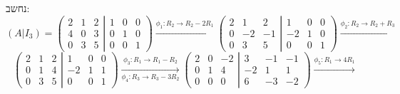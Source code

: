 \documentclass{article}
\begin{document}
נחשב:
\[
    (A | I_3) =
    \left(
    \begin{matrix}
            2 & 1 & 2 \\
            4 & 0 & 3 \\
            0 & 3 & 5
        \end{matrix}
    \left|
    \begin{matrix}
            1 & 0 & 0 \\
            0 & 1 & 0 \\
            0 & 0 & 1
        \end{matrix}
    \right.
    \right)
    \xrightarrow{\phi_1: R_2\rightarrow R_2-2R_1}
    \left(
    \begin{matrix}
            2 & 1  & 2  \\
            0 & -2 & -1 \\
            0 & 3  & 5
        \end{matrix}
    \left|
    \begin{matrix}
            1  & 0 & 0 \\
            -2 & 1 & 0 \\
            0  & 0 & 1
        \end{matrix}
    \right.
    \right)
    \xrightarrow{\phi_2: R_2\rightarrow R_2+R_3}
\]
\[
    \left(
    \begin{matrix}
            2 & 1 & 2 \\
            0 & 1 & 4 \\
            0 & 3 & 5
        \end{matrix}
    \left|
    \begin{matrix}
            1  & 0 & 0 \\
            -2 & 1 & 1 \\
            0  & 0 & 1
        \end{matrix}
    \right.
    \right)
    \xrightarrow[\phi_4: R_3\rightarrow R_3-3R_2]{\phi_3: R_1\rightarrow R_1-R_2}
    \left(
    \begin{matrix}
            2 & 0 & -2 \\
            0 & 1 & 4  \\
            0 & 0 & 0
        \end{matrix}
    \left|
    \begin{matrix}
            3  & -1 & -1 \\
            -2 & 1  & 1  \\
            6  & -3 & -2
        \end{matrix}
    \right.
    \right)
    \xrightarrow{\phi_5: R_1\rightarrow 4R_1}
\]
\end{document}
